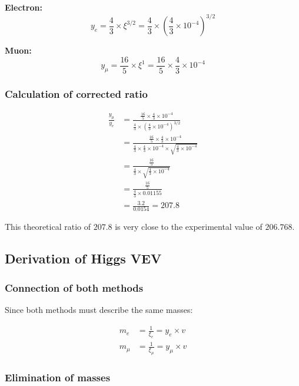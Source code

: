 \documentclass[12pt,a4paper]{report}
\begin{document}
\textbf{Electron:}
\begin{equation}
	y_e = \frac{4}{3} \times \xi^{3/2} = \frac{4}{3} \times \left(\frac{4}{3} \times 10^{-4}\right)^{3/2}
\end{equation}

\textbf{Muon:}
\begin{equation}
	y_\mu = \frac{16}{5} \times \xi^1 = \frac{16}{5} \times \frac{4}{3} \times 10^{-4}
\end{equation}

\subsubsection{Calculation of corrected ratio}

\begin{align}
	\frac{y_\mu}{y_e} &= \frac{\frac{16}{5} \times \frac{4}{3} \times 10^{-4}}{\frac{4}{3} \times \left(\frac{4}{3} \times 10^{-4}\right)^{3/2}}\\
	&= \frac{\frac{16}{5} \times \frac{4}{3} \times 10^{-4}}{\frac{4}{3} \times \frac{4}{3} \times 10^{-4} \times \sqrt{\frac{4}{3} \times 10^{-4}}}\\
	&= \frac{\frac{16}{5}}{\frac{4}{3} \times \sqrt{\frac{4}{3} \times 10^{-4}}}\\
	&= \frac{\frac{16}{5}}{\frac{4}{3} \times 0.01155}\\
	&= \frac{3.2}{0.0154} = 207.8
\end{align}

This theoretical ratio of $207.8$ is very close to the experimental value of $206.768$.

\subsection{Derivation of Higgs VEV}

\subsubsection{Connection of both methods}

Since both methods must describe the same masses:

\begin{align}
	m_e &= \frac{1}{\xi_e} = y_e \times v\\
	m_\mu &= \frac{1}{\xi_\mu} = y_\mu \times v
\end{align}

\subsubsection{Elimination of masses}
\end{document}
